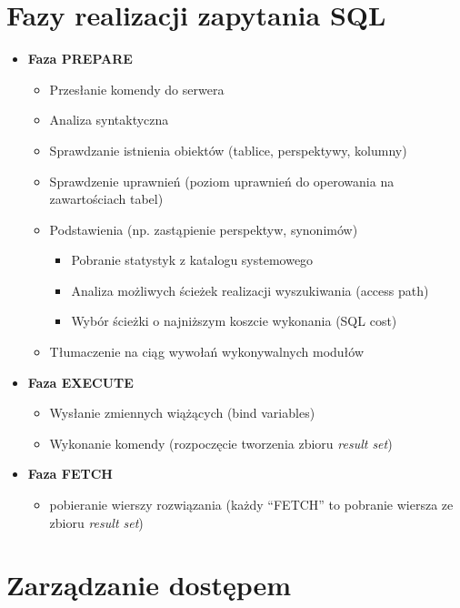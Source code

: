 \documentclass[a4paper,twoside]{article}
\begin{document}
  	\part*{Fazy realizacji zapytania SQL}
  	\begin{itemize}
  		\item \textbf{Faza PREPARE}		%
  		\begin{itemize}
  			\item Przesłanie komendy do serwera
  			\item Analiza syntaktyczna
  			\item Sprawdzanie istnienia obiektów (tablice, perspektywy, kolumny)
  			\item Sprawdzenie uprawnień (poziom uprawnień do operowania na zawartościach tabel)
  			\item Podstawienia (np. zastąpienie perspektyw, synonimów)
  			\begin{itemize}
  				\item Pobranie statystyk z katalogu systemowego
  				\item Analiza możliwych ścieżek realizacji wyszukiwania (access path)
  				\item Wybór ścieżki o najniższym koszcie wykonania (SQL cost)
  			\end{itemize}
  			\item Tłumaczenie na ciąg wywołań wykonywalnych modułów
  		\end{itemize}
  		\item \textbf{Faza EXECUTE}		%
  		\begin{itemize}
  			\item Wysłanie zmiennych wiążących (bind variables)
  			\item Wykonanie komendy (rozpoczęcie tworzenia zbioru \emph{result set})
  		\end{itemize}
  		\item \textbf{Faza FETCH}		%
  		\begin{itemize}
  			\item pobieranie wierszy rozwiązania (każdy “FETCH” to pobranie wiersza ze zbioru \emph{result set})
  		\end{itemize}
  	\end{itemize}
  	
  	
  	\part*{Zarządzanie dostępem}
  	
\end{document}

